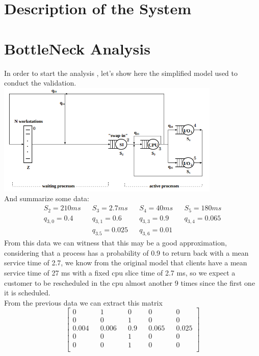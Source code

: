 \documentclass[12pt,a4paper]{article}
\begin{document}
	
	
	\section{Description of the System}
	

    \section{BottleNeck Analysis}
    In order to start the analysis , let's show here the simplified model 
    used to conduct the validation.
    \includegraphics[width=0.8\textwidth]{Images/simplified_model.png}
    \\And summarize some data:
    \begin{displaymath}
        \begin{aligned}
        S_2 = 210ms && S_3= 2.7ms && S_4 = 40ms && S_5=180ms\\
        q_{3,0}= 0.4&& q_{3,1}=0.6 && q_{3,3} = 0.9 && q_{3,4}= 0.065\\
        && q_{3.5}= 0.025 && q_{3,6}=0.01 && 
        \end{aligned}
    \end{displaymath}
    From this data we can witness that this may be a good approximation, considering that
    a process has a probability of 0.9 to return back with a mean service time of 2.7, 
    we know from the original model that clients have a mean service time of 27 ms with 
    a fixed cpu slice time of 2.7 ms, so we expect a customer to be rescheduled in the cpu 
    almost another 9 times since the first one it is scheduled. \\

    From the previous data we can extract this matrix 
    \begin{displaymath}
        \begin{bmatrix}
            0 && 1 && 0 && 0 && 0 \\
            0 && 0 && 1 && 0 && 0 \\
            0.004 && 0.006 && 0.9 && 0.065 && 0.025 \\
            0 && 0 && 1 && 0 && 0 \\
            0 && 0 && 1 && 0 && 0 \\
        \end{bmatrix}
    \end{displaymath}
\end{document}
